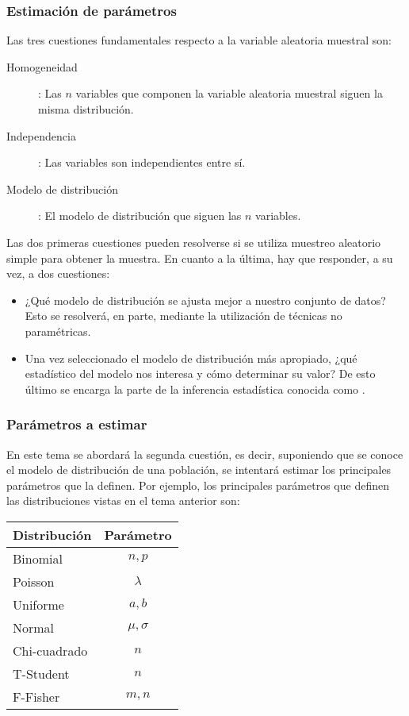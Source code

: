 \begin{frame}
\frametitle{Estimación de parámetros}
Las tres cuestiones fundamentales respecto a la variable aleatoria muestral son:
\begin{description}
\item [Homogeneidad]: Las $n$ variables que componen la variable aleatoria muestral siguen la misma distribución.
\item [Independencia]: Las variables son independientes entre sí.
\item [Modelo de distribución]: El modelo de distribución que siguen las $n$ variables.
\end{description}
Las dos primeras cuestiones pueden resolverse si se utiliza muestreo aleatorio simple para obtener la muestra. En cuanto a la última, hay que responder, a su vez, a dos cuestiones:
\begin{itemize}
\item ¿Qué modelo de distribución se ajusta mejor a nuestro conjunto de datos? Esto se resolverá, en parte, mediante la utilización de técnicas no paramétricas.
\item Una vez seleccionado el modelo de distribución más apropiado, ¿qué estadístico del modelo nos interesa y cómo determinar su valor? 
De esto último se encarga la parte de la inferencia estadística conocida como .
\end{itemize}
\end{frame}


\begin{frame}
\frametitle{Parámetros a estimar}
En este tema se abordará la segunda cuestión, es decir, suponiendo que se conoce el modelo de distribución de una población, se intentará estimar los principales parámetros que la definen.
Por ejemplo, los principales parámetros que definen las distribuciones vistas en el tema anterior son:
\begin{center}
\begin{tabular}{|l|c|}
\hline
Distribución & Parámetro \\
\hline\hline
Binomial & $n,p$\\
\hline
Poisson & $\lambda$\\
\hline
Uniforme & $a,b$\\
\hline
Normal & $\mu,\sigma$\\
\hline
Chi-cuadrado & $n$\\
\hline
T-Student & $n$\\
\hline
F-Fisher & $m,n$\\
\hline
\end{tabular}
\end{center}
\end{frame}


